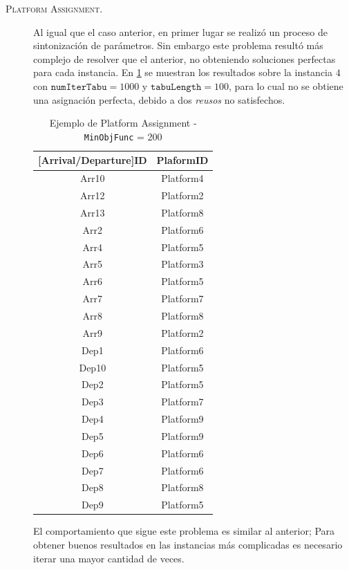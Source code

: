 \documentclass[letter, 10pt]{article}
\begin{document}
\begin{description}
    \item[\textsc{Platform Assignment.}] Al igual que el caso anterior, en primer lugar se realizó un proceso de sintonización de parámetros. Sin embargo este problema resultó más complejo de resolver que el anterior, no obteniendo soluciones perfectas para cada instancia. En \ref{table2} se muestran los resultados sobre la instancia $4$ con $\texttt{numIterTabu}=1000$ y $\texttt{tabuLength}=100$, para lo cual no se obtiene una asignación perfecta, debido a dos \textit{reusos} no satisfechos.
\begin{table}[htpb!]
\centering
\label{table2}
\begin{tabular}{|c|c|}
\hline
\rowcolor[HTML]{329A9D}
\textbf{{[}Arrival/Departure{]}ID} & \textbf{PlaformID} \\ \hline
Arr10                              & Platform4          \\ \hline
Arr12                              & Platform2          \\ \hline
Arr13                              & Platform8          \\ \hline
Arr2                               & Platform6          \\ \hline
Arr4                               & Platform5          \\ \hline
Arr5                               & Platform3          \\ \hline
Arr6                               & Platform5          \\ \hline
Arr7                               & Platform7          \\ \hline
Arr8                               & Platform8          \\ \hline
Arr9                               & Platform2          \\ \hline
Dep1                               & Platform6          \\ \hline
Dep10                              & Platform5          \\ \hline
Dep2                               & Platform5          \\ \hline
Dep3                               & Platform7          \\ \hline
Dep4                               & Platform9          \\ \hline
Dep5                               & Platform9          \\ \hline
Dep6                               & Platform6          \\ \hline
Dep7                               & Platform6          \\ \hline
Dep8                               & Platform8          \\ \hline
Dep9                               & Platform5          \\ \hline
\end{tabular}
\caption{Ejemplo de Platform Assignment - \texttt{MinObjFunc} = 200}
\end{table}    
El comportamiento que sigue este problema es similar al anterior; Para obtener buenos resultados en las instancias más complicadas es necesario iterar una mayor cantidad de veces.


\end{description}
\end{document}
